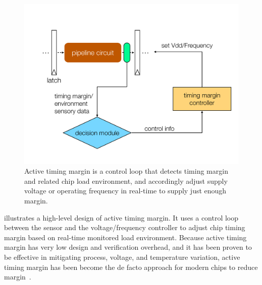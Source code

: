 \begin{figure}[t!]
\centering 
  \includegraphics[trim=0 0 0 0,clip,width=0.9\linewidth]{graphs/background/atm.pdf}
  \caption{Active timing margin is a control loop that detects timing margin and related chip load environment, and accordingly adjust supply voltage or operating frequency in real-time to supply just enough margin.}
  \label{fig:atm-example}
\vspace{-0.2in}
\end{figure}

 illustrates a high-level design of active timing margin. It uses a control loop between the sensor and the voltage/frequency controller to adjust chip timing margin based on real-time monitored load environment. Because active timing margin has very low design and verification overhead, and it has been proven to be effective in mitigating process, voltage, and temperature variation, active timing margin has been become the de facto approach for modern chips to reduce margin~\cite{efurgy2011active, bowman201222nm, tokunaga20145,grenat20145,bowman20158,webel2015robust,vezyrtzis2018droop,zu2016tistate}.

